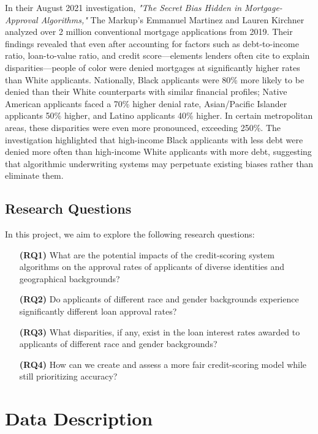 \documentclass[manuscript,authorversion,nonacm]{acmart} %
\begin{document}
In their August 2021 investigation, \textit{"The Secret Bias Hidden in Mortgage-Approval Algorithms,"} The Markup's Emmanuel Martinez and Lauren Kirchner analyzed over 2 million conventional mortgage applications from 2019. Their findings revealed that even after accounting for factors such as debt-to-income ratio, loan-to-value ratio, and credit score—elements lenders often cite to explain disparities—people of color were denied mortgages at significantly higher rates than White applicants. Nationally, Black applicants were 80\% more likely to be denied than their White counterparts with similar financial profiles; Native American applicants faced a 70\% higher denial rate, Asian/Pacific Islander applicants 50\% higher, and Latino applicants 40\% higher. In certain metropolitan areas, these disparities were even more pronounced, exceeding 250\%. The investigation highlighted that high-income Black applicants with less debt were denied more often than high-income White applicants with more debt, suggesting that algorithmic underwriting systems may perpetuate existing biases rather than eliminate them.%

\subsection{Research Questions}

In this project, we aim to explore the following research questions:

\begin{itemize}
  \item [\textbf{(RQ1)}] What are the potential impacts of the credit-scoring system algorithms on the approval rates of applicants of diverse identities and geographical backgrounds?
  \item [\textbf{(RQ2)}] Do applicants of different race and gender backgrounds experience significantly different loan approval rates?
  \item [\textbf{(RQ3)}] What disparities, if any, exist in the loan interest rates awarded to applicants of different race and gender backgrounds?
  \item [\textbf{(RQ4)}] How can we create and assess a more fair credit-scoring model while still prioritizing accuracy?
\end{itemize}




\section{Data Description}
\end{document}
